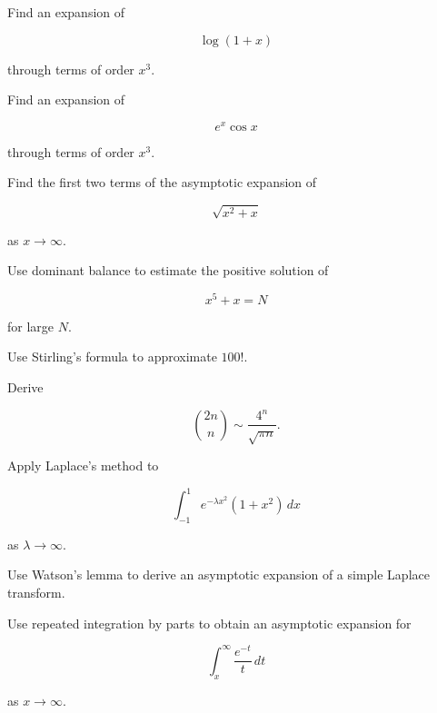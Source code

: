 \begin{exercise}[2]
Find an expansion of

\[
\log(1+x)
\]

through terms of order \(x^3\).
\end{exercise}

\begin{exercise}[2]
Find an expansion of

\[
e^x\cos x
\]

through terms of order \(x^3\).
\end{exercise}

\begin{exercise}[2]
Find the first two terms of the asymptotic expansion of

\[
\sqrt{x^2+x}
\]

as \(x\to\infty\).
\end{exercise}

\begin{exercise}[2]
Use dominant balance to estimate the positive solution of

\[
x^5+x=N
\]

for large \(N\).
\end{exercise}

\begin{exercise}[2]
Use Stirling's formula to approximate \(100!\).
\end{exercise}

\begin{exercise}[2]
Derive

\[
\binom{2n}{n}
\sim
\frac{4^n}{\sqrt{\pi n}}.
\]
\end{exercise}

\begin{exercise}[3]
Apply Laplace's method to

\[
\int_{-1}^{1}
e^{-\lambda x^2}(1+x^2)\,dx
\]

as \(\lambda\to\infty\).
\end{exercise}

\begin{exercise}[3]
Use Watson's lemma to derive an asymptotic expansion of a simple
Laplace transform.
\end{exercise}

\begin{exercise}[3]
Use repeated integration by parts to obtain an asymptotic expansion for

\[
\int_x^\infty
\frac{e^{-t}}{t}\,dt
\]

as \(x\to\infty\).
\end{exercise}

